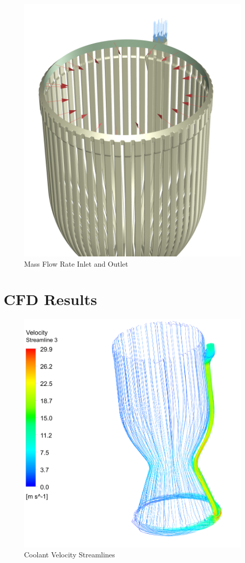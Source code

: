 \begin{figure}
    \centering
    \includegraphics[width=0.5\linewidth]{Mass Flow Rate Inlet and Outlet.png}
    \caption{Mass Flow Rate Inlet and Outlet}
    \label{fig:Mass Flow Rate Inlet and Outlet}
\end{figure}
\section{CFD Results 
}
\begin{figure}
    \centering
    \includegraphics[width=1\linewidth]{Images/Coolant Velocity Streamlines.png}
    \caption{Coolant Velocity Streamlines}
    \label{fig:Coolant Velocity Streamlines}
\end{figure}

